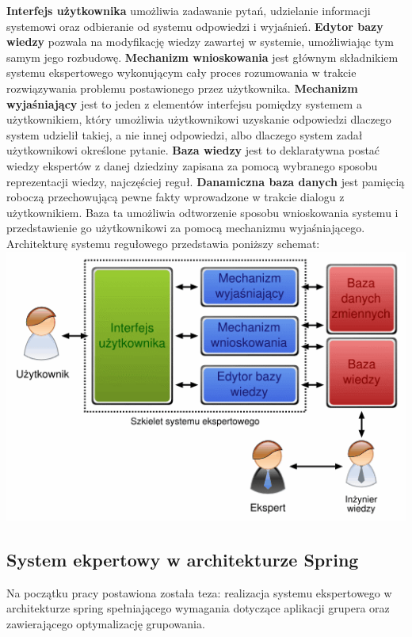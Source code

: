 \textbf{Interfejs użytkownika} umożliwia zadawanie pytań, udzielanie informacji systemowi oraz odbieranie od systemu odpowiedzi i wyjaśnień.
\textbf{Edytor bazy wiedzy} pozwala na modyfikację wiedzy zawartej w systemie, umożliwiając tym samym jego rozbudowę.
\textbf{Mechanizm wnioskowania} jest głównym składnikiem systemu ekspertowego wykonującym cały proces rozumowania w trakcie rozwiązywania problemu postawionego przez użytkownika.
\textbf{Mechanizm wyjaśniający} jest to jeden z elementów interfejsu pomiędzy systemem a użytkownikiem, który umożliwia użytkownikowi uzyskanie odpowiedzi dlaczego system udzielił takiej, a nie innej odpowiedzi, albo dlaczego system zadał użytkownikowi określone pytanie.
\textbf{Baza wiedzy} jest to deklaratywna postać wiedzy ekspertów z danej dziedziny zapisana za pomocą wybranego sposobu reprezentacji wiedzy, najczęściej reguł.
\textbf{Danamiczna baza danych} jest pamięcią roboczą przechowującą pewne fakty wprowadzone w trakcie dialogu z użytkownikiem. Baza ta umożliwia odtworzenie sposobu wnioskowania systemu i przedstawienie go użytkownikowi za pomocą mechanizmu wyjaśniającego.
Architekturę systemu regułowego przedstawia poniższy schemat:
\includegraphics[scale=0.5]{images/expert-system}

\subsection{System ekpertowy w architekturze Spring}
\label{sec:systemEkpertowyArchitekturaSpring}

Na początku pracy postawiona została teza: realizacja systemu ekspertowego w architekturze spring spełniającego wymagania dotyczące aplikacji grupera oraz zawierającego optymalizację grupowania.

